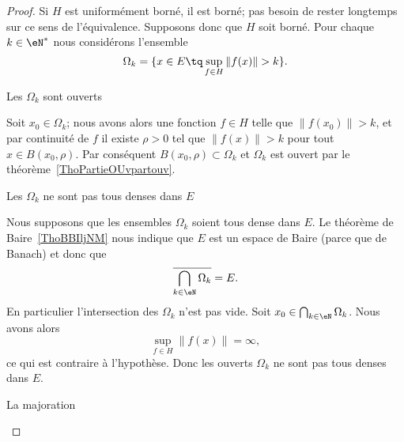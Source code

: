 \begin{proof}
    Si \( H\) est uniformément borné, il est borné; pas besoin de rester longtemps sur ce sens de l'équivalence. Supposons donc que \( H\) soit borné. Pour chaque \( k\in \eN^*\) nous considérons l'ensemble
    \begin{equation}
        \Omega_k=\{ x\in E\tq \sup_{f\in H}\| f(x) \|>k \}.
    \end{equation}

    \begin{subproof}
        \item[Les \( \Omega_k\) sont ouverts]

            Soit \( x_0\in \Omega_k\); nous avons alors une fonction \( f\in H\) telle que \(  \| f(x_0) \|>k \), et par continuité de \( f\) il existe \( \rho>0\) tel que \( \| f(x) \|>k\) pour tout \( x\in B(x_0,\rho)\). Par conséquent \( B(x_0,\rho)\subset \Omega_k\) et \( \Omega_k\) est ouvert par le théorème~\ref{ThoPartieOUvpartouv}.

        \item[Les \( \Omega_k\) ne sont pas tous denses dans \( E\)]

            Nous supposons que les ensembles \( \Omega_k\) soient tous dense dans \( E\). Le théorème de Baire~\ref{ThoBBIljNM} nous indique que \( E\) est un espace de Baire (parce que de Banach) et donc que
            \begin{equation}
                \overline{ \bigcap_{k\in \eN}\Omega_k }=E.
            \end{equation}
            En particulier l'intersection des \( \Omega_k\) n'est pas vide. Soit \( x_0\in \bigcap_{k\in \eN}\Omega_k\). Nous avons alors
            \begin{equation}
                \sup_{f\in H}\| f(x) \|=\infty,
            \end{equation}
            ce qui est contraire à l'hypothèse. Donc les ouverts \( \Omega_k\) ne sont pas tous denses dans \(E\).

        \item[La majoration]


\end{subproof}
\end{proof}
